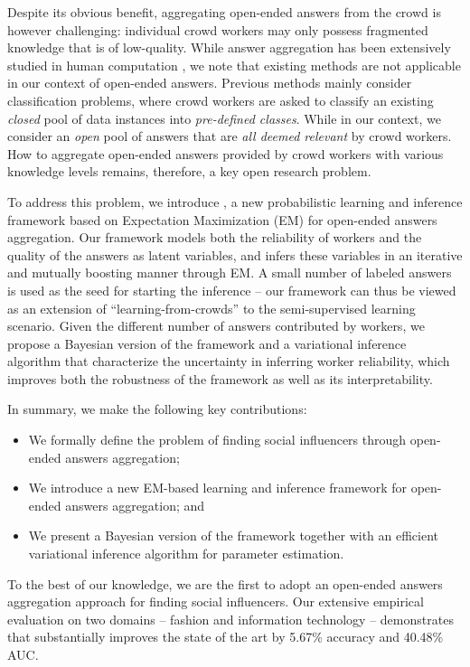 Despite its obvious benefit, aggregating open-ended answers from the crowd is however challenging: individual crowd workers may only possess fragmented knowledge that is of low-quality. While answer aggregation has been extensively studied in human computation \cite{dawid1979maximum,whitehill2009whose,ZhengLLSC17}, we note that existing methods are not applicable in our context of open-ended answers. Previous methods mainly consider classification problems, where crowd workers are asked to classify an existing \emph{closed} pool of data instances into \emph{pre-defined classes}. While in our context, we consider an \emph{open} pool of answers that are \emph{all deemed relevant} by crowd workers. How to aggregate open-ended answers provided by crowd workers with various knowledge levels remains, therefore, a key open research problem.

To address this problem, we introduce \sys, a new probabilistic learning and inference framework based on Expectation Maximization (EM) for open-ended answers aggregation. Our framework models both the reliability of workers and the quality of the answers as latent variables, and infers these variables in an iterative and mutually boosting manner through EM. A small number of labeled answers is used as the seed for starting the inference -- our framework can thus be viewed as an extension of ``learning-from-crowds''  \cite{raykar2010learning,tian2012learning,yang2018leveraging} to the semi-supervised learning scenario. Given the different number of answers contributed by workers, we propose a Bayesian version of the framework and a variational inference algorithm that characterize the uncertainty in inferring worker reliability, which improves both the robustness of the framework as well as its interpretability. 

In summary, we make the following key contributions:
\begin{itemize}
\item We formally define the problem of finding social influencers through open-ended answers aggregation;
\item We introduce a new EM-based learning and inference framework for open-ended answers aggregation; and
\item We present a Bayesian version of the framework together with an efficient variational inference algorithm for parameter estimation. 
\end{itemize}

To the best of our knowledge, we are the first to adopt an open-ended answers aggregation approach for finding social influencers. Our extensive empirical evaluation on two domains -- fashion and information technology -- demonstrates that \sys substantially improves the state of the art by 5.67\% accuracy and 40.48\% AUC.


